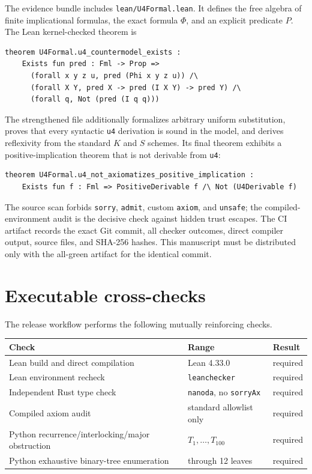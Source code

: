 \documentclass[11pt]{article}
\begin{document}
The evidence bundle includes \texttt{lean/U4Formal.lean}.  It defines
the free algebra of finite implicational formulas, the exact formula $\Phi$,
and an explicit predicate $P$.  The Lean kernel-checked theorem is
\begin{verbatim}
theorem U4Formal.u4_countermodel_exists :
    Exists fun pred : Fml -> Prop =>
      (forall x y z u, pred (Phi x y z u)) /\
      (forall X Y, pred X -> pred (I X Y) -> pred Y) /\
      (forall q, Not (pred (I q q)))
\end{verbatim}
The strengthened file additionally formalizes arbitrary uniform substitution,
proves that every syntactic \texttt{u4} derivation is sound in the model, and
derives reflexivity from the standard $K$ and $S$ schemes.  Its final theorem
exhibits a positive-implication theorem that is not derivable from \texttt{u4}:
\begin{verbatim}
theorem U4Formal.u4_not_axiomatizes_positive_implication :
    Exists fun f : Fml => PositiveDerivable f /\ Not (U4Derivable f)
\end{verbatim}
The source scan forbids \texttt{sorry}, \texttt{admit}, custom
\texttt{axiom}, and \texttt{unsafe}; the compiled-environment audit is the
decisive check against hidden trust escapes.  The CI artifact records the exact
Git commit, all checker outcomes, direct compiler output, source files, and
SHA-256 hashes.  This manuscript must be distributed only with the all-green
artifact for the identical commit.

\section{Executable cross-checks}

The release workflow performs the following mutually reinforcing checks.

\begin{center}
\begin{tabular}{@{}lll@{}}
\toprule
Check & Range & Result\\
\midrule
Lean build and direct compilation & Lean 4.33.0 & required\\
Lean environment recheck & \texttt{leanchecker} & required\\
Independent Rust type check & \texttt{nanoda}, no \texttt{sorryAx} & required\\
Compiled axiom audit & standard allowlist only & required\\
Python recurrence/interlocking/major obstruction & $T_1,\ldots,T_{100}$ & required\\
Python exhaustive binary-tree enumeration & through 12 leaves & required\\
\bottomrule
\end{tabular}
\end{center}
\end{document}
